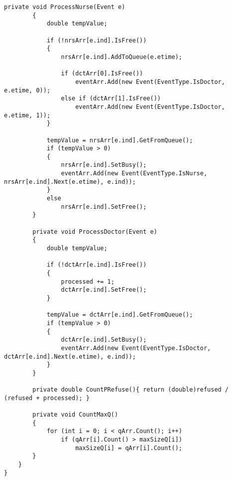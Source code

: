 \begin{lstlisting}[label=code, caption = Основные методы]
		private void ProcessNurse(Event e)
		{
			double tempValue;
			
			if (!nrsArr[e.ind].IsFree())
			{
				nrsArr[e.ind].AddToQueue(e.etime);
				
				if (dctArr[0].IsFree())
					eventArr.Add(new Event(EventType.IsDoctor, e.etime, 0));
				else if (dctArr[1].IsFree())
					eventArr.Add(new Event(EventType.IsDoctor, e.etime, 1));
			}
			
			tempValue = nrsArr[e.ind].GetFromQueue();
			if (tempValue > 0)
			{
				nrsArr[e.ind].SetBusy();
				eventArr.Add(new Event(EventType.IsNurse, nrsArr[e.ind].Next(e.etime), e.ind));
			}
			else
				nrsArr[e.ind].SetFree();
		}
		
		private void ProcessDoctor(Event e)
		{
			double tempValue;
			
			if (!dctArr[e.ind].IsFree())
			{
				processed += 1;
				dctArr[e.ind].SetFree();
			}
			
			tempValue = dctArr[e.ind].GetFromQueue();
			if (tempValue > 0)
			{
				dctArr[e.ind].SetBusy();
				eventArr.Add(new Event(EventType.IsDoctor, dctArr[e.ind].Next(e.etime), e.ind));
			}
		}
		
		private double CountPRefuse(){ return (double)refused / (refused + processed); }
		
		private void CountMaxQ()
		{
			for (int i = 0; i < qArr.Count(); i++)
				if (qArr[i].Count() > maxSizeQ[i])
					maxSizeQ[i] = qArr[i].Count();
		}
	}
}


\end{lstlisting}